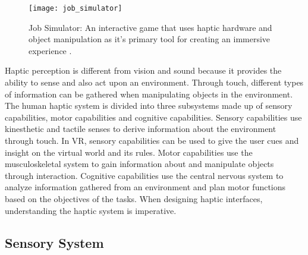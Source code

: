 \begin{figure}[h]
	\centering
	\texttt{[image: job\_simulator]}
	\caption{Job Simulator: An interactive game that uses haptic hardware and object manipulation as it's primary tool for creating an immersive experience \cite{jobSim}.}
	
	\label{fig:job_simulator}
\end{figure}

 \par Haptic perception is different from vision and sound because it provides the ability to sense and also act upon an environment. Through touch, different types of information can be gathered when manipulating objects in the environment. The human haptic system is divided into three subsystems made up of sensory capabilities, motor capabilities and cognitive capabilities. Sensory capabilities use kinesthetic and tactile senses to derive information about the environment through touch. In VR, sensory capabilities can be used to give the user cues and insight on the virtual world and its rules. Motor capabilities use the musculoskeletal system to gain information about and manipulate objects through interaction. Cognitive capabilities use the central nervous system to analyze information gathered from an environment and plan motor functions based on the objectives of the tasks. When designing haptic interfaces, understanding the haptic system is imperative.






\subsection{Sensory System} \label{tactile_kinesthetic}

